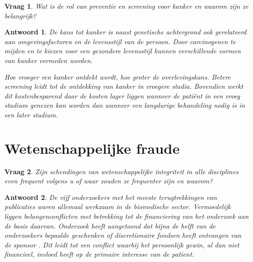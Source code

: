 \documentclass{article}
\theoremstyle{plain}
\newtheorem{question}{Vraag}
\theoremstyle{nonumberplain}
\newtheorem{answer}{Antwoord}
\begin{document}
\begin{question}
Wat is de rol van preventie en screening voor kanker en waarom zijn ze
belangrijk?
\end{question}

\begin{answer}

De kans tot kanker is naast genetische achtergrond ook gerelateerd aan
omgevingsfactoren en de levensstijl van de persoon. Door carcinogenen te mijden
en te kiezen voor een gezondere levensstijl kunnen verschillende vormen van
kanker vermeden worden.

Hoe vroeger een kanker ontdekt wordt, hoe groter de overlevingskans. Betere
\emph{screening} leidt tot de ontdekking van kanker in vroegere stadia.
Bovendien werkt dit kostenbesparend daar de kosten lager liggen wanneer de
patiënt in een vroeg stadium genezen kan worden dan wanneer een langdurige
behandeling nodig is in een later stadium.

\end{answer}

\section{Wetenschappelijke fraude}

\begin{question}
Zijn schendingen van wetenschappelijke integriteit in alle disciplines even
frequent volgens u of waar zouden ze frequenter zijn en waarom?
\end{question}

\begin{answer}

De vijf onderzoekers met het meeste terugtrekkingen van publicaties waren
allemaal werkzaam in de biomedische sector. Vermoedelijk liggen
belangenconflicten met betrekking tot de financiering van het onderzoek aan de
basis daarvan. Onderzoek heeft aangetoond dat bijna de helft van de onderzoekers
bepaalde geschenken of discretionaire fondsen heeft ontvangen van de sponsor
\cite{doi:10.1001/jama.289.4.454}. Dit leidt tot een conflict waarbij het
persoonlijk gewin, al dan niet financieel, invloed heeft op de primaire
interesse van de patient.

\end{answer}

\nocite{*}
\printbibliography
\end{document}
